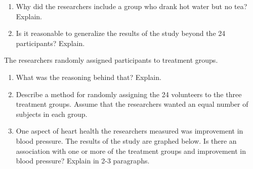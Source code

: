 \documentclass[letterpaper]{article}
\begin{document}
\begin{enumerate}
\def\labelenumi{(\alph{enumi})}
\setcounter{enumi}{1}
\item
  Why did the researchers include a group who drank hot water but no tea? Explain.
\item
  Is it reasonable to generalize the results of the study beyond the 24 participants? Explain.
\end{enumerate}

The researchers randomly assigned participants to treatment groups.

\begin{enumerate}
\def\labelenumi{(\alph{enumi})}
\setcounter{enumi}{3}
\item
  What was the reasoning behind that? Explain.
\item
  Describe a method for randomly assigning the 24 volunteers to the three treatment groups. Assume that the researchers wanted an equal number of subjects in each group.
\item
  One aspect of heart health the researchers measured was improvement in blood pressure. The results of the study are graphed below. Is there an association with one or more of the treatment groups and improvement in blood pressure? Explain in 2-3 paragraphs.
\end{enumerate}
\end{document}
